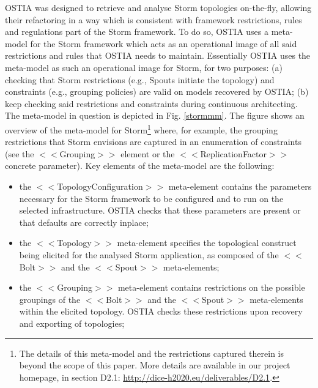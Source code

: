 OSTIA was designed to retrieve and analyse Storm topologies on-the-fly, allowing their refactoring in a way which is consistent with framework restrictions, rules and regulations part of the Storm framework. To do so, OSTIA uses a meta-model for the Storm framework which acts as an operational image of all said restrictions and rules that OSTIA needs to maintain. 
Essentially OSTIA uses the meta-model as such an operational image for Storm, for two purposes: (a) checking that Storm restrictions (e.g., Spouts initiate the topology) and constraints (e.g., grouping policies) are valid on models recovered by OSTIA; (b) keep checking said restrictions and constraints during continuous architecting. 
The meta-model in question is depicted in Fig. \ref{stormmm}. The figure shows an overview of the meta-model for Storm\footnote{The details of this meta-model and the restrictions captured therein is beyond the scope of this paper. More details are available in our project homepage, in section D2.1: \url{http://dice-h2020.eu/deliverables/D2.1}.} where, for example, the grouping restrictions that Storm envisions are captured in an enumeration of constraints (see the $<<$Grouping$>>$ element or the $<<$ReplicationFactor$>>$ concrete parameter). Key elements of the meta-model are the following:
\begin{itemize}
\item the $<<$TopologyConfiguration$>>$ meta-element contains the parameters necessary for the Storm framework to be configured and to run on the selected infrastructure. OSTIA checks that these parameters are present or that defaults are correctly inplace;
\item the $<<$Topology$>>$ meta-element specifies the topological construct being elicited for the analysed Storm application, as composed of the $<<$Bolt$>>$ and  the $<<$Spout$>>$ meta-elements;
\item  the $<<$Grouping$>>$ meta-element contains restrictions on the possible groupings of the $<<$Bolt$>>$ and the $<<$Spout$>>$ meta-elements within the elicited topology. OSTIA checks these restrictions upon recovery and exporting of topologies;
\end{itemize}

